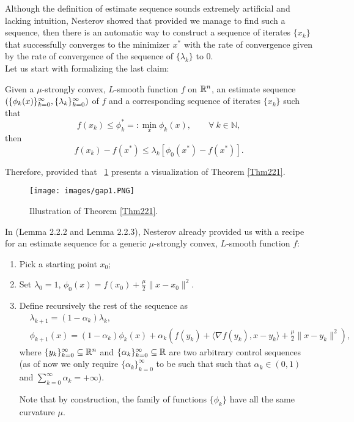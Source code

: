 \documentclass{article}
\begin{document}
Although the definition of estimate sequence sounds extremely artificial and lacking intuition, Nesterov showed that provided we manage to find such a sequence, then there is an automatic way to construct a sequence of iterates $\{x_k\}$ that successfully converges to the minimizer $x^\ast$ with the rate of convergence given by the rate of convergence of the sequence of $\{\lambda_k\}$ to 0.\\

Let us start with formalizing the last claim:


\begin{thm}\label{Thm221}

Given a $\mu$-strongly convex, $L$-smooth function $f$ on $\mathbb{R}^n$, an estimate sequence $\left( \{\phi_k(x)\}_{k=0}^\infty, \{\lambda_k\}_{k=0}^\infty \right)$ of $f$ and a corresponding sequence of iterates $\{x_k\}$ such that 
$$f(x_k) \leq \phi_{k}^{\ast} =: \min\limits_{x} \phi_k (x), \qquad \forall \ k \in \mathbb{N},$$ 
then
\[
	f(x_k) - f(x^*) \leq \lambda_k \left[ \phi_0(x^*) - f(x^*) \right].
\]
\end{thm}

Therefore, provided that 
\figurename \ \ref{Thm221plot} presents a visualization of Theorem \ref{Thm221}. 
\begin{figure}
  \centering
  \texttt{[image: images/gap1.PNG]}
  \caption{Illustration of Theorem \ref{Thm221}.\label{Thm221plot}}
\end{figure}
\newline


In \cite{Nesterov1998} (Lemma 2.2.2 and Lemma 2.2.3), Nesterov already provided us with a recipe for an estimate sequence for a generic $\mu$-strongly convex, $L$-smooth function $f$: 
\begin{enumerate}
\item Pick a starting point $x_0$;
\item Set  $\lambda_0 = 1$, $\phi_0{(x)} = f(x_0) + \frac{\mu}{2}\|{x - x_0}\|^2$.
\item Define recursively the rest of the sequence as
\begin{align}
& \lambda_{k+1} = (1-\alpha_k)\lambda_k, \\
& \phi_{k+1}(x) = (1-\alpha_k)\phi_k(x) + \alpha_k\left( f(y_k) + \langle\nabla f(y_k), x-y_k\rangle + \frac{\mu}{2}\lVert{x - y_k}\rVert^2\right ) ,
\end{align}
where $\{y_k\}_{k=0}^{\infty} \subseteq \mathbb{R}^n$ and  $\{\alpha_k\}_{k=0}^{\infty} \subseteq \mathbb{R}$ are two arbitrary control sequences (as of now we only require $\{\alpha_k\}_{k=0}^{\infty}$ to be such that such that $\alpha_k \in (0, 1)$ and $\sum_{k=0}^\infty{\alpha_k} = +\infty$). 

Note that by construction, the family of functions $\{\phi_k\}$ have all the same curvature $\mu$.
\end{enumerate}
\end{document}
